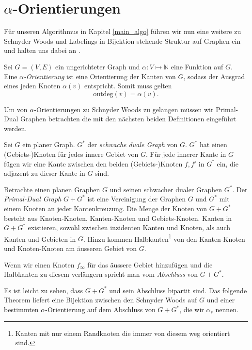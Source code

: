 \section{$\alpha$-Orientierungen}\label{alpha_orientations}

Für unseren Algorithmus in Kapitel \ref{main_algo} führen wir nun eine weitere zu Schnyder-Woods und Labelings in Bijektion stehende Struktur auf Graphen ein und halten uns dabei an \cite{felsner04}.

\begin{definition}
Sei $G=(V,E)$ ein ungerichteter Graph und $\alpha:V\mapsto\mathbb{N}$ eine Funktion auf $G$. Eine $\alpha$\textit{-Orientierung} ist eine Orientierung der Kanten von $G$, sodass der Ausgrad eines jeden Knoten $\alpha(v)$ entspricht. Somit muss gelten $$\text{outdeg}(v) = \alpha(v).$$
\end{definition}

Um von $\alpha$-Orientierungen zu Schnyder Woods zu gelangen müssen wir Primal-Dual Graphen betrachten die mit den nächsten beiden Definitionen eingeführt werden.

\begin{definition}
Sei $G$ ein planer Graph. $G^*$ der \textit{schwache duale Graph} von $G$. $G^*$ hat einen (Gebiets-)Knoten für jedes innere Gebiet von $G$. Für jede innerer Kante in $G$ fügen wir eine Kante zwischen den beiden (Gebiets-)Knoten $f,f'$ in $G^*$ ein, die adjazent zu dieser Kante in $G$ sind.
\end{definition}

\begin{definition}
Betrachte einen planen Graphen $G$ und seinen schwacher dualer Graphen $G^*$. Der \textit{Primal-Dual Graph} $G+G^*$ ist eine Vereinigung der Graphen $G$ und $G^*$ mit einem Knoten an jeder Kantenkreuzung. Die Menge der Knoten von $G+G^*$ besteht aus Knoten-Knoten, Kanten-Knoten und Gebiets-Knoten. Kanten in $G+G^*$ existieren, sowohl zwischen inzidenten Kanten und Knoten, als auch Kanten und Gebieten in $G$. Hinzu kommen Halbkanten\footnote{Kanten mit nur einem Randknoten die immer von diesem weg orientiert sind.} von den Kanten-Knoten und Knoten-Knoten am äusseren Gebiet von $G$.

Wenn wir einen Knoten $f_\infty$ für das äussere Gebiet hinzufügen und die Halbkanten zu diesem verlängern spricht man vom \textit{Abschluss} von $G+G^*$.

\end{definition}
Es ist leicht zu sehen, dass $G+G^*$ und sein Abschluss bipartit sind. Das folgende Theorem liefert eine Bijektion zwischen den Schnyder Woods auf $G$ und einer bestimmten $\alpha$-Orientierung auf dem Abschluss von $G+G^*$, die wir $\alpha_s$ nennen.


